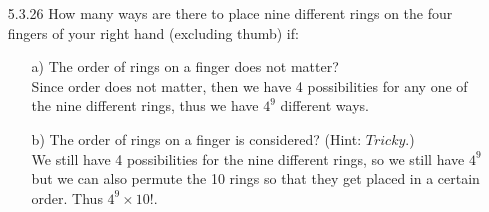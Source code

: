 \documentclass[12pt]{article}
\begin{document}
\begin{enumerate}
\item[5.3.26] How many ways are there to place nine different rings on the four fingers of your right hand (excluding thumb) if:
\begin{enumerate}
\item[a)] The order of rings on a finger does not matter? \\ 
Since order does not matter, then we have 4 possibilities for any one of the nine different rings, thus we have
$4^9$ different ways.
\item[b)] The order of rings on a finger is considered? (Hint: $Tricky$.) \\ 
We still have 4 possibilities for the nine different rings, so we still have $4^9$ but we can also permute
the 10 rings so that they get placed in a certain order. Thus $4^9 \times 10!$.
\end{enumerate}


\end{enumerate}
\end{document}

